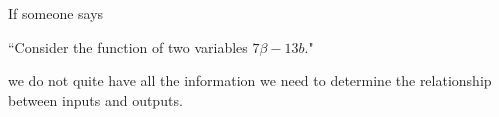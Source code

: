 \begin{center}
\href{https://www.youtube.com/watch?v=dvoG5P9Uczg}{} \hspace{1cm}
\end{center}
If someone says 
\vspace{-.01cm}
\begin{center}
``Consider the function of two variables $7\beta-13 b$." 
\end{center}
we do not quite have all the information we need to determine the relationship between inputs and outputs. 
